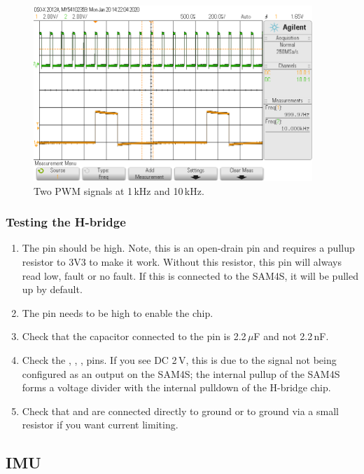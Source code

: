 \begin{figure}
\centering
\includegraphics[height=2.60417in]{figs/PWM_2.png}
\caption{Two PWM signals at 1\,kHz and 10\,kHz.}
\end{figure}


\subsubsection{Testing the H-bridge}
\label{testing-the-h-bridge}

\begin{enumerate}
\item The  pin should be high.  Note, this is an
  open-drain pin and requires a pullup resistor to 3V3 to make it
  work.  Without this resistor, this pin will always read low, fault
  or no fault.  If this is connected to the SAM4S, it will be pulled
  up by default.

\item The  pin needs to be high to enable the chip.

\item Check that the capacitor connected to the  pin is
  2.2\,$\mu$F and not 2.2\,nF.

\item Check the , , ,  pins.
  If you see DC 2\,V, this is due to the signal not being configured
  as an output on the SAM4S; the internal pullup of the SAM4S forms a
  voltage divider with the internal pulldown of the H-bridge chip.

\item Check that  and  are connected
  directly to ground or to ground via a small resistor if you want
  current limiting.
\end{enumerate}


\subsection{IMU}
\label{imu}

